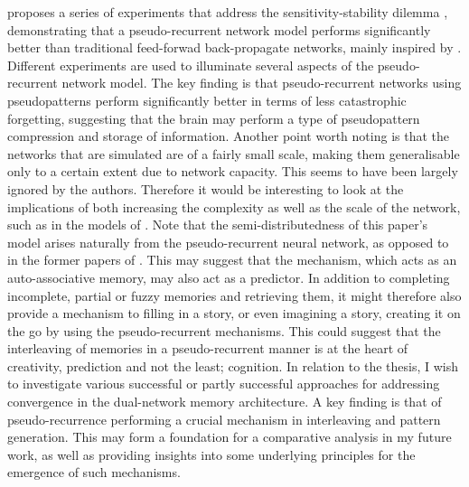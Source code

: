 \cite{French1997} proposes a series of experiments that address the sensitivity-stability dilemma \citep{Hebb1949}, demonstrating that a pseudo-recurrent network model performs significantly better than traditional feed-forwad back-propagate networks, mainly inspired by \cite{McClelland1995}. Different experiments are used to illuminate several aspects of the pseudo-recurrent network model. The key finding is that pseudo-recurrent networks using pseudopatterns perform significantly better in terms of less catastrophic forgetting, suggesting that the brain may perform a type of pseudopattern compression and storage of information. Another point worth noting is that the networks that are simulated are of a fairly small scale, making them generalisable only to a certain extent due to network capacity. This seems to have been largely ignored by the authors. Therefore it would be interesting to look at the implications of both increasing the complexity as well as the scale of the network, such as in the models of \citep{Hattori2010, Hattori2014}. Note that the semi-distributedness of this paper's model arises naturally from the pseudo-recurrent neural network, as opposed to in the former papers of \cite{French1992, French1994}. This may suggest that the mechanism, which acts as an auto-associative memory, may also act as a predictor. In addition to completing incomplete, partial or fuzzy memories and retrieving them, it might therefore also provide a mechanism to filling in a story, or even imagining a story, creating it on the go by using the pseudo-recurrent mechanisms. This could suggest that the interleaving of memories in a pseudo-recurrent manner is at the heart of creativity, prediction and not the least; cognition. In relation to the thesis, I wish to investigate various successful or partly successful approaches for addressing convergence in the dual-network memory architecture. A key finding is that of pseudo-recurrence performing a crucial mechanism in interleaving and pattern generation. This may form a foundation for a comparative analysis in my future work, as well as providing insights into some underlying principles for the emergence of such mechanisms.

